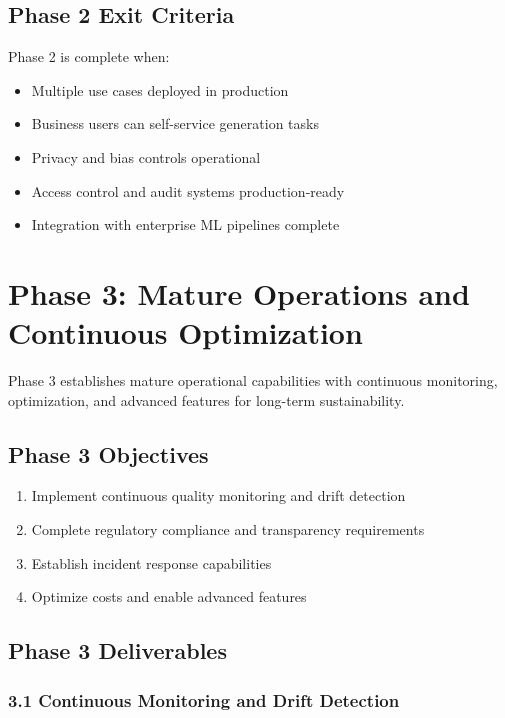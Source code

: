 \subsection{Phase 2 Exit Criteria}

Phase 2 is complete when:
\begin{itemize}
  \item[\checkmark] Multiple use cases deployed in production
  \item[\checkmark] Business users can self-service generation tasks
  \item[\checkmark] Privacy and bias controls operational
  \item[\checkmark] Access control and audit systems production-ready
  \item[\checkmark] Integration with enterprise ML pipelines complete
\end{itemize}


\section{Phase 3: Mature Operations and Continuous Optimization}

Phase 3 establishes mature operational capabilities with continuous monitoring,
optimization, and advanced features for long-term sustainability.

\subsection{Phase 3 Objectives}

\begin{enumerate}
  \item Implement continuous quality monitoring and drift detection
  \item Complete regulatory compliance and transparency requirements
  \item Establish incident response capabilities
  \item Optimize costs and enable advanced features
\end{enumerate}

\subsection{Phase 3 Deliverables}

\subsubsection{3.1 Continuous Monitoring and Drift Detection}

